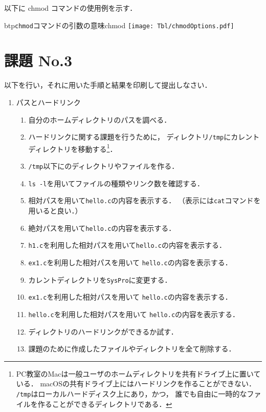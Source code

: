 以下に chmod コマンドの使用例を示す．

\begin{mytable}{btp}{\texttt{chmod}コマンドの引数の意味}{chmod}
  \texttt{[image: Tbl/chmodOptions.pdf]}
\end{mytable}



\newpage
\section*{課題 No.3}
以下を行い，それに用いた手順と結果を印刷して提出しなさい．

\begin{enumerate}
\item パスとハードリンク
\begin{enumerate}
\item 自分のホームディレクトリのパスを調べる．
\item ハードリンクに関する課題を行うために，
ディレクトリ\texttt{/tmp}にカレントディレクトリを移動する\footnote{
PC教室のMacは一般ユーザのホームディレクトリを共有ドライブ上に置いている．
macOSの共有ドライブ上にはハードリンクを作ることができない．
\texttt{/tmp}はローカルハードディスク上にあり，かつ，
誰でも自由に一時的なファイルを作ることができるディレクトリである．}．
\item \texttt{/tmp}以下にのディレクトリやファイルを作る．
\item \texttt{ls -l}を用いてファイルの種類やリンク数を確認する．
\item 相対パスを用いて\texttt{hello.c}の内容を表示する．
（表示には\texttt{cat}コマンドを用いると良い．）
\item 絶対パスを用いて\texttt{hello.c}の内容を表示する．
\item \texttt{h1.c}を利用した相対パスを用いて\texttt{hello.c}の内容を表示する．
\item \texttt{ex1.c}を利用した相対パスを用いて
\texttt{hello.c}の内容を表示する．
\item カレントディレクトリを\texttt{SysPro}に変更する．
\item \texttt{ex1.c}を利用した相対パスを用いて
\texttt{hello.c}の内容を表示する．
\item \texttt{hello.c}を利用した相対パスを用いて
\texttt{hello.c}の内容を表示する．
\item ディレクトリのハードリンクができるか試す．
\item 課題のために作成したファイルやディレクトリを全て削除する．
\end{enumerate}


\end{enumerate}
